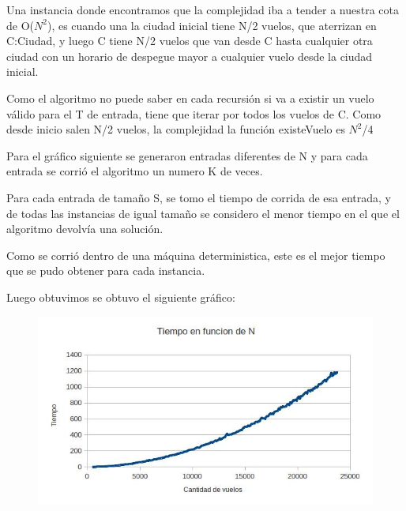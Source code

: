 Una instancia donde encontramos que la complejidad iba a tender a nuestra cota de O($N^{2}$), es cuando una la ciudad inicial tiene N/2 vuelos, que aterrizan en C:Ciudad, y luego C tiene N/2 vuelos que van desde C hasta cualquier otra ciudad con un horario de despegue mayor a cualquier vuelo desde la ciudad inicial.

Como el algoritmo no puede saber en cada recursi\'on si va a existir un vuelo v\'alido para el T de entrada, tiene que iterar por todos los vuelos de C. Como desde inicio salen N/2 vuelos, la complejidad la funci\'on existeVuelo es $N^{2}$/4

Para el gr\'afico siguiente se generaron entradas diferentes de N y para cada entrada se corri\'o el algoritmo un numero K de veces.

Para cada entrada de tamaño S, se tomo el tiempo de corrida de esa entrada, y de todas las instancias de igual tamaño se considero el menor tiempo en el que el algoritmo devolv\'ia una soluci\'on.

Como se corri\'o dentro de una m\'aquina deterministica, este es el mejor tiempo que se pudo obtener para cada instancia. 

Luego obtuvimos se obtuvo el siguiente gr\'afico:

\begin{figure}[ht]
	\begin{minipage}[t]{\linewidth}
		\centering
		\includegraphics[width=\textwidth]{GraficoDeVuelosYTiempo.jpg}
	\end{minipage}	
\end{figure}
